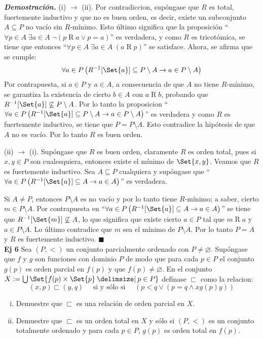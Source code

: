 \documentclass[11pt]{article}
\providecommand\st{\;|\;}
\newcommand\SetSymbol[1][]{%
    \nonscript\:#1\vert
    \allowbreak
    \nonscript\:
    \mathopen{}}
\renewcommand\st{\SetSymbol[\delimsize]}
\renewcommand\st{\SetSymbol[\delimsize]}
\renewcommand{\emptyset}{\varnothing}
\newcommand{\QED}{\hfill\ensuremath{\blacksquare}}
\begin{document}
    \textit{\textbf{Demostración.}} (i) $\to$ (ii). Por contradiccion, supóngase que $R$ es total, fuertemente inductivo y que no es buen orden, es decir, existe un subconjunto $A \subseteq P$ no vacío sin $R$-mínimo. Esto último significa que la proposición ``$\forall p \in A \; \exists a \in A \; \lnot(p \mathrel{R} a \lor p=a)$'' es verdadera, y como $R$ es tricotómica, se tiene que entonces ``$\forall p \in A \; \exists a \in A \; (a \mathrel{R} p)$'' se satisface. Ahora, se afirma que se cumple:
    \[ \forall a \in P \left( R^{-1}[\Set{a}] \subseteq P\setminus A \rightarrow a \in P \setminus A \right) \]
    Por contrapuesta, si $a \in P$ y $a \in A$, a consecuencia de que $A$ no tiene $R$-mínimo, se garantiza la existencia de cierto $b \in A$ con $a \mathrel{R} b$, probando que $R^{-1}[\Set{a}] \not\subseteq P\setminus A$. Por lo tanto la proposicion  ``$\forall a \in P \left( R^{-1}[\Set{a}] \subseteq P\setminus A \rightarrow a \in P \setminus A \right)$'' es verdadera y como $R$ es fuertemente inductivo, se tiene que $P=P\setminus A$. Esto contradice la hipótesis de que $A$ no es vacío. Por lo tanto $R$ es buen orden.

    (ii) $\to$ (i). Supóngase que $R$ es buen orden, claramente $R$ es orden total, pues si $x,y \in P$ son cualesquiera, entonces existe el mínimo de $\Set{x,y}$. Veamos que $R$ es fuertemente inductivo. Sea $A \subseteq P$ cualquiera y supóngase que ``$\forall a \in P \left( R^{-1}[\Set{a}] \subseteq A \rightarrow a \in A \right)$'' es verdadera.

    Si $A \neq P$, entonces $P \setminus A$ es no vacío y por lo tanto tiene $R$-mínimo; a saber, cierto $m \in P \setminus A$. Por contrapuesta en ``$\forall a \in P \left( R^{-1}[\Set{a}] \subseteq A \rightarrow a \in A \right)$'' se tiene que $R^{-1}[\Set{m}] \not\subseteq A$, lo que significa que existe cierto $a \in P$ tal que $m \mathrel{R} a$ y $a \in P \setminus A$. Lo último contradice que $m$ sea el mínimo de $P\setminus A$. Por lo tanto $P=A$ y $R$ es fuertemente inductivo. \QED \\

    \textbf{Ej 6} Sea $(P,<)$ un conjunto parcialmente ordenado con $P \neq \emptyset$. Supóngase que $f$ y $g$ son funciones con dominio $P$ de modo que para cada $p \in P$ el conjunto $g(p)$ es orden parcial en $f(p)$ y que $f(p)\neq \emptyset$. En el conjunto $X:=\bigcup\Set{ f(p) \times \Set{p} \st p \in P  }$ defínase $\sqsubset$ como la relacion:
    \[ (x,p) \sqsubset (y,q) \quad \text{ si y sólo si } \quad \left( p < q \lor \left( p=q \land x \mathrel{g(p)} y  \right) \right) \]
    \begin{enumerate}[i)]
      \item Demuestre que $\sqsubset$ es una relación de orden parcial en $X$.
      \item Demuestre que $\sqsubset$ es un orden total en $X$ y sólo si $(P,<)$ es un conjunto totalmente ordenado y para cada $p \in P$, $g(p)$ es orden total en $f(p)$.
    \end{enumerate}
\end{document}
